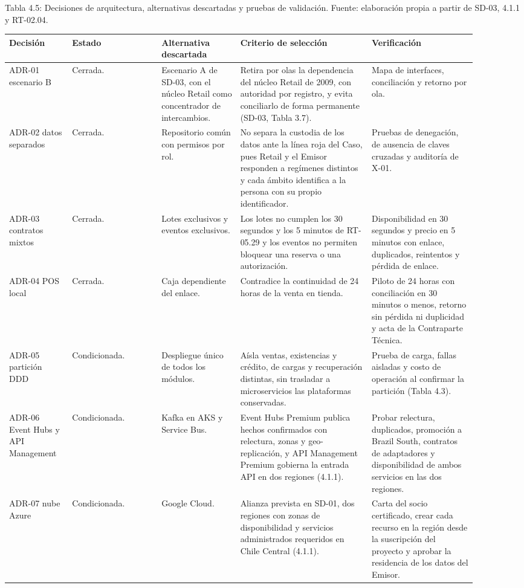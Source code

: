 \documentclass[11pt]{article}
\begin{document}
Tabla 4.5: Decisiones de arquitectura, alternativas descartadas y pruebas de validación. Fuente: elaboración propia a partir de SD-03, 4.1.1 y RT-02.04.\par\nopagebreak
\begin{longtable}{@{}p{0.125\linewidth}p{0.17\linewidth}p{0.15\linewidth}p{0.25\linewidth}p{0.205\linewidth}@{}}
\toprule Decisión & Estado & Alternativa descartada & Criterio de selección & Verificación \\
\midrule\endhead\bottomrule\endlastfoot
ADR-01 escenario B & Cerrada. & Escenario A de SD-03, con el núcleo Retail como concentrador de intercambios. & Retira por olas la dependencia del núcleo Retail de 2009, con autoridad por registro, y evita conciliarlo de forma permanente (SD-03, Tabla 3.7). & Mapa de interfaces, conciliación y retorno por ola. \\
ADR-02 datos separados & Cerrada. & Repositorio común con permisos por rol. & No separa la custodia de los datos ante la línea roja del Caso, pues Retail y el Emisor responden a regímenes distintos y cada ámbito identifica a la persona con su propio identificador. & Pruebas de denegación, de ausencia de claves cruzadas y auditoría de X-01. \\
ADR-03 contratos mixtos & Cerrada. & Lotes exclusivos y eventos exclusivos. & Los lotes no cumplen los 30 segundos y los 5 minutos de RT-05.29 y los eventos no permiten bloquear una reserva o una autorización. & Disponibilidad en 30 segundos y precio en 5 minutos con enlace, duplicados, reintentos y pérdida de enlace. \\
ADR-04 POS local & Cerrada. & Caja dependiente del enlace. & Contradice la continuidad de 24 horas de la venta en tienda. & Piloto de 24 horas con conciliación en 30 minutos o menos, retorno sin pérdida ni duplicidad y acta de la Contraparte Técnica. \\
ADR-05 partición DDD & Condicionada. & Despliegue único de todos los módulos. & Aísla ventas, existencias y crédito, de cargas y recuperación distintas, sin trasladar a microservicios las plataformas conservadas. & Prueba de carga, fallas aisladas y costo de operación al confirmar la partición (Tabla 4.3). \\
ADR-06 Event Hubs y API Management & Condicionada. & Kafka en AKS y Service Bus. & Event Hubs Premium publica hechos confirmados con relectura, zonas y geo-replicación, y API Management Premium gobierna la entrada API en dos regiones (4.1.1). & Probar relectura, duplicados, promoción a Brazil South, contratos de adaptadores y disponibilidad de ambos servicios en las dos regiones. \\
ADR-07 nube Azure & Condicionada. & Google Cloud. & Alianza prevista en SD-01, dos regiones con zonas de disponibilidad y servicios administrados requeridos en Chile Central (4.1.1). & Carta del socio certificado, crear cada recurso en la región desde la suscripción del proyecto y aprobar la residencia de los datos del Emisor. \\
\end{longtable}
\end{document}
